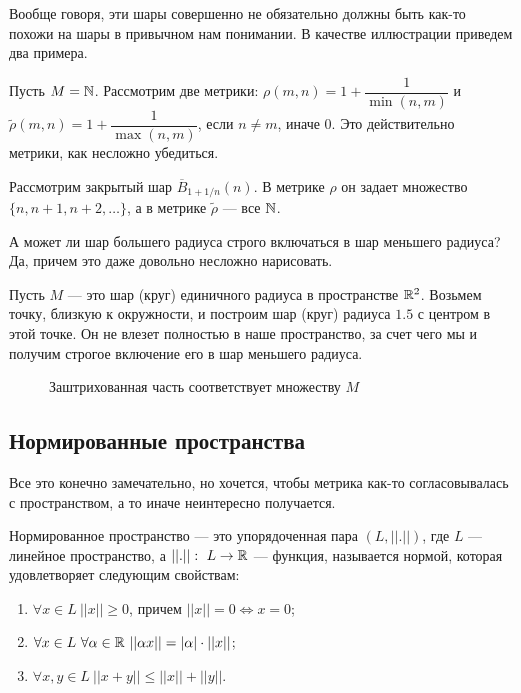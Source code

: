 Вообще говоря, эти шары совершенно не обязательно должны быть как-то похожи на шары в привычном нам понимании. В качестве иллюстрации приведем два примера.
\begin{Examples}
Пусть $M = \mathbb{N}$. Рассмотрим две метрики: $\rho(m, n) = 1 + \dfrac{1}{\min(n, m)}$ и $\widetilde{\rho}(m, n) = 1 + \dfrac{1}{\max(n, m)}$, если $n \neq m$, иначе 0. Это действительно метрики, как несложно убедиться.

Рассмотрим закрытый шар $\overline{B}_{1 + 1/n}(n)$. В метрике $\rho$ он задает множество $\{n, n+1, n+2, \ldots\}$, а в метрике $\widetilde{\rho}$ --- все $\mathbb{N}$. 
\end{Examples}

\begin{Examples}
А может ли шар большего радиуса строго включаться в шар меньшего радиуса? Да, причем это даже довольно несложно нарисовать.

Пусть $M$ --- это шар (круг) единичного радиуса в пространстве $\mathbb{R}^2$. Возьмем точку, близкую к окружности, и построим шар (круг) радиуса $1.5$ с центром в этой точке. Он не влезет полностью в наше пространство, за счет чего мы и получим строгое включение его в шар меньшего радиуса.
\begin{figure}[H]
\center{\texttt{[image: 14-1]} }
\caption{Заштрихованная часть соответствует множеству $M$}
\end{figure}
\end{Examples}

\subsection{Нормированные пространства}
Все это конечно замечательно, но хочется, чтобы метрика как-то согласовывалась с пространством, а то иначе неинтересно получается.

\begin{Def}
Нормированное пространство --- это упорядоченная пара $(L, ||.||)$, где $L$ --- линейное пространство, а $||.||:\ L \to \mathbb{R}$ --- функция, называется нормой, которая удовлетворяет следующим свойствам:
\begin{enumerate}
\item $\forall x \in L\ ||x|| \geq 0$, причем $||x|| = 0 \Leftrightarrow x = 0$;
\item $\forall x \in L\ \forall \alpha \in \mathbb{R}\ ||\alpha x|| = |\alpha|\cdot ||x||$;
\item $\forall x, y \in L\ ||x + y|| \leq ||x|| + ||y||$.
\end{enumerate}
\end{Def}

